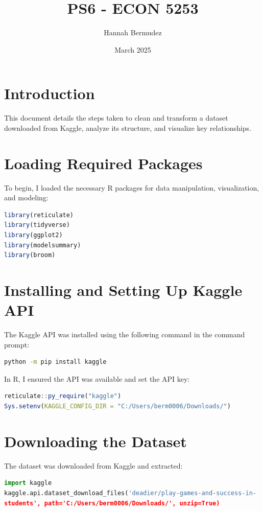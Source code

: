 \documentclass{article}
\title{PS6 - ECON 5253}
\author{Hannah Bermudez}
\date{March 2025}
\begin{document}
\maketitle

\section{Introduction}
This document details the steps taken to clean and transform a dataset downloaded from Kaggle, analyze its structure, and visualize key relationships.

\section{Loading Required Packages}
To begin, I loaded the necessary R packages for data manipulation, visualization, and modeling:

\begin{lstlisting}[language=R, basicstyle=\ttfamily, keywordstyle=\color{blue}]
library(reticulate)
library(tidyverse)
library(ggplot2)
library(modelsummary)
library(broom)
\end{lstlisting}

\section{Installing and Setting Up Kaggle API}
The Kaggle API was installed using the following command in the command prompt:

\begin{lstlisting}[language=bash]
python -m pip install kaggle
\end{lstlisting}

In R, I ensured the API was available and set the API key:

\begin{lstlisting}[language=R]
reticulate::py_require("kaggle")
Sys.setenv(KAGGLE_CONFIG_DIR = "C:/Users/berm0006/Downloads/")
\end{lstlisting}

\section{Downloading the Dataset}
The dataset was downloaded from Kaggle and extracted:

\begin{lstlisting}[language=Python]
import kaggle
kaggle.api.dataset_download_files('deadier/play-games-and-success-in-
students', path='C:/Users/berm0006/Downloads/', unzip=True)
\end{lstlisting}
\end{document}

